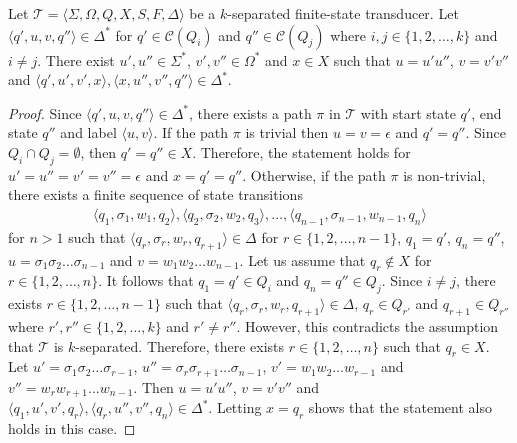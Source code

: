 \begin{proposition}\label{prop:fst_separator_path}
  Let $\mathcal{T} = \langle \Sigma, \Omega, Q, X, S, F, \Delta \rangle$ be a
  $k$-separated finite-state transducer. Let $\langle q', u, v, q'' \rangle
  \in \Delta^*$ for $q' \in \mathcal{C}(Q_i)$ and $q'' \in \mathcal{C}(Q_j)$ where
  $i, j \in \{ 1, 2, \ldots, k \}$ and $i \neq j$. There exist $u', u'' \in
  \Sigma^*$, $v', v'' \in \Omega^*$ and $x \in X$ such that $u = u'u''$, $v = v'v''$
  and $\langle q', u', v', x \rangle, \langle x, u'', v'', q'' \rangle \in \Delta^*$.
\end{proposition}

\begin{proof}
  Since $\langle q', u, v, q'' \rangle \in \Delta^*$, there exists a path $\pi$
  in $\mathcal{T}$ with start state $q'$, end state $q''$ and label $\langle
    u, v \rangle$. If the path $\pi$ is trivial then $u = v = \epsilon$ and $q' =
    q''$. Since $Q_i \cap Q_j = \emptyset$, then $q' = q'' \in X$. Therefore, the
  statement holds for $u' = u'' = v' = v'' = \epsilon$ and $x = q' = q''$.
  Otherwise, if the path $\pi$ is non-trivial, there exists a finite sequence
  of state transitions
  \begin{align*}
    \langle q_1, \sigma_1, w_1, q_2 \rangle, \langle q_2, \sigma_2, w_2,
    q_3 \rangle, \ldots, \langle q_{n-1}, \sigma_{n-1}, w_{n-1}, q_n
    \rangle
  \end{align*}
  for $n > 1$ such that $\langle q_r, \sigma_r, w_r, q_{r+1} \rangle \in
    \Delta$ for $r \in \{ 1, 2, \ldots, n-1 \}$, $q_1 = q'$, $q_n = q''$, $u =
    \sigma_1\sigma_2\ldots\sigma_{n-1}$ and $v = w_1 w_2 \ldots w_{n-1}$. Let us
  assume that $q_r \not\in X$ for $r \in \{ 1, 2, \ldots, n \}$. It follows
  that $q_1 = q' \in Q_i$ and $q_n = q'' \in Q_j$. Since $i \neq j$, there
  exists $r \in \{ 1, 2, \ldots, n-1 \}$ such that $\langle q_r, \sigma_r,
    w_r, q_{r+1} \rangle \in \Delta$, $q_r \in Q_{r'}$ and $q_{r+1} \in Q_{r''}$
  where $r', r'' \in \{ 1, 2, \ldots, k \}$ and $r' \neq r''$. However, this
  contradicts the assumption that $\mathcal{T}$ is $k$-separated. Therefore,
  there exists $r \in \{ 1, 2, \ldots, n \}$ such that $q_r \in X$. Let $u' =
    \sigma_1 \sigma_2 \ldots \sigma_{r-1}$, $u'' = \sigma_r \sigma_{r+1} \ldots
    \sigma_{n-1}$, $v' = w_1 w_2 \ldots w_{r-1}$ and $v'' = w_r w_{r+1} \ldots
    w_{n-1}$. Then $u = u'u''$, $v = v'v''$ and $\langle q_1, u', v', q_r
    \rangle, \langle q_r, u'', v'', q_n \rangle \in \Delta^*$. Letting $x = q_r$
  shows that the statement also holds in this case.
\end{proof}

